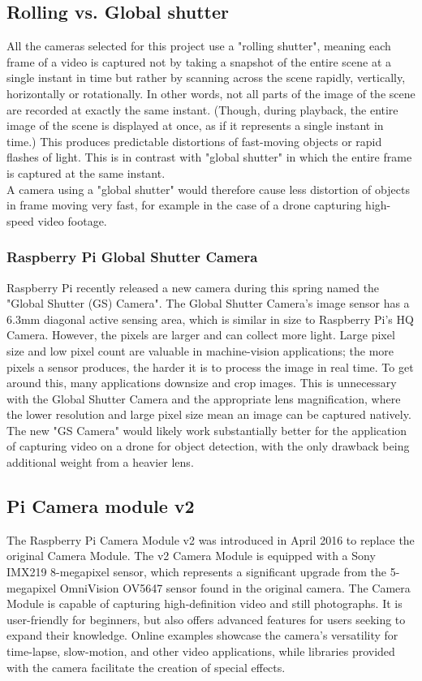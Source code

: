 \subsection{Rolling vs. Global shutter}
All the cameras selected for this project use a "rolling shutter", meaning each frame of a video is captured not by taking a snapshot of the entire scene at a single instant in time but rather by scanning across the scene rapidly, vertically, horizontally or rotationally. In other words, not all parts of the image of the scene are recorded at exactly the same instant. (Though, during playback, the entire image of the scene is displayed at once, as if it represents a single instant in time.) This produces predictable distortions of fast-moving objects or rapid flashes of light. This is in contrast with "global shutter" in which the entire frame is captured at the same instant. \cite{wikipedia-rolling-shutter}\\
A camera using a "global shutter" would therefore cause less distortion of objects in frame moving very fast, for example in the case of a drone capturing high-speed video footage.

\subsubsection{Raspberry Pi Global Shutter Camera}
Raspberry Pi recently released a new camera during this spring named the "Global Shutter (GS) Camera". The Global Shutter Camera’s image sensor has a 6.3mm diagonal active sensing area, which is similar in size to Raspberry Pi’s HQ Camera. However, the pixels are larger and can collect more light. Large pixel size and low pixel count are valuable in machine-vision applications; the more pixels a sensor produces, the harder it is to process the image in real time. To get around this, many applications downsize and crop images. This is unnecessary with the Global Shutter Camera and the appropriate lens magnification, where the lower resolution and large pixel size mean an image can be captured natively. \cite{documentation-RPi_cameras}\\
The new "GS Camera" would likely work substantially better for the application of capturing video on a drone for object detection, with the only drawback being additional weight from a heavier lens.

\iffalse
\subsection{Pi Camera module v2}
The Raspberry Pi Camera Module v2 was introduced in April 2016 to replace the original Camera Module. The v2 Camera Module is equipped with a Sony IMX219 8-megapixel sensor, which represents a significant upgrade from the 5-megapixel OmniVision OV5647 sensor found in the original camera. The Camera Module is capable of capturing high-definition video and still photographs. It is user-friendly for beginners, but also offers advanced features for users seeking to expand their knowledge. Online examples showcase the camera's versatility for time-lapse, slow-motion, and other video applications, while libraries provided with the camera facilitate the creation of special effects.\\

